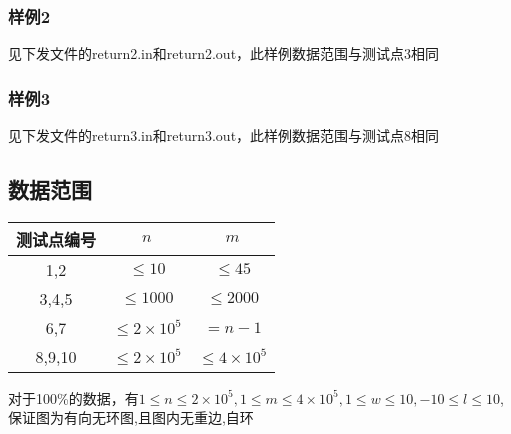 \documentclass[12pt]{ctexart}
\begin{document}
\subsubsection{样例2}
见下发文件的return2.in和return2.out，此样例数据范围与测试点3相同
\subsubsection{样例3}
见下发文件的return3.in和return3.out，此样例数据范围与测试点8相同
\subsection{数据范围}
\begin{center}
	\begin{tabular}{|c|c|c|}
		\hline 测试点编号&$n$&$m$\\
		\hline 1,2&$\le10$&$\le45$\\
		\hline 3,4,5&$\le1000$&$\le2000$\\
		\hline 6,7&$\le2\times10^5$&$=n-1$\\
		\hline 8,9,10&$\le2\times10^5$&$\le4\times10^5$\\
		\hline
	\end{tabular}
\end{center}
对于100\%的数据，有$1\le n\le2\times10^5,1\le m\le4\times10^5,1\le w\le10,-10\le l\le10$,保证图为有向无环图,且图内无重边,自环
\end{document}
